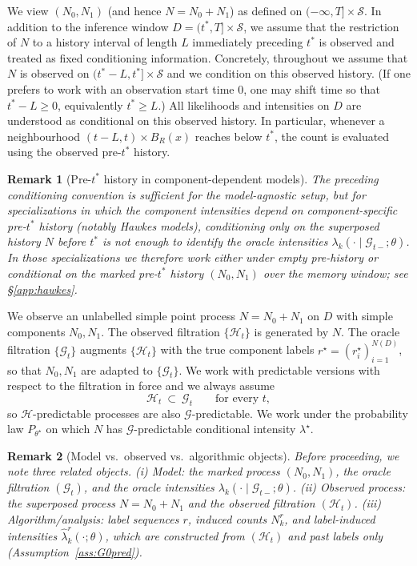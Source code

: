 \documentclass{statsoc}
\newtheorem{remark}[remark]{Remark}
\newcommand{\1}{\mathbbm{1}}
\begin{document}
We view $(N_0,N_1)$ (and hence $N=N_0+N_1$) as defined on $(-\infty,T]\times\mathcal S$.
In addition to the inference window $D=(t^\ast,T]\times\mathcal S$, we assume that the restriction of $N$ to a history interval of length $L$ immediately preceding $t^\ast$ is observed and treated as fixed conditioning information. Concretely, throughout we assume that $N$ is observed on $(t^\ast-L,t^\ast]\times\mathcal S$ and we condition on this observed history. (If one prefers to work with an observation start time $0$, one may shift time so that $t^\ast-L\ge 0$, equivalently $t^\ast\ge L$.) All likelihoods and intensities on $D$ are understood as conditional on this observed history. In particular, whenever a neighbourhood $(t-L,t)\times B_R(x)$ reaches below $t^\ast$, the count is evaluated using the observed pre-$t^\ast$ history.

\begin{remark}[Pre-\(t^\ast\) history in component-dependent models]\label{rem:prehistory-marked}
The preceding conditioning convention is sufficient for the model-agnostic setup, but for specializations in which the component intensities depend on component-specific pre-\(t^\ast\) history (notably Hawkes models), conditioning only on the superposed history \(N\) before \(t^\ast\) is not enough to identify the oracle intensities \(\lambda_k(\cdot\mid\mathcal G_{t-};\theta)\). In those specializations we therefore work either under empty pre-history or conditional on the marked pre-\(t^\ast\) history \((N_0,N_1)\) over the memory window; see \S\ref{app:hawkes}.
\end{remark}



We observe an unlabelled simple point process $N=N_0+N_1$ on $D$ with simple components $N_0,N_1$. The observed filtration $\{\mathcal H_t\}$ is generated by $N$. The oracle filtration $\{\mathcal G_t\}$ augments $\{\mathcal H_t\}$ with the true component labels $r^\star=(r^\star_i)_{i=1}^{N(D)}$, so that $N_0,N_1$ are adapted to $\{\mathcal G_t\}$. We work with predictable versions with respect to the filtration in force and we always assume
\[
\mathcal H_t\ \subset\ \mathcal G_t\qquad\text{for every }t,
\]
so $\mathcal H$-predictable processes are also $\mathcal G$-predictable. We work under the probability law $P_{\theta^\star}$ on which $N$ has $\mathcal G$-predictable conditional intensity $\lambda^\star$.

\begin{remark}[Model vs.\ observed vs.\ algorithmic objects]\label{rem:objects}
Before proceeding, we note three related objects. (i) Model: the marked process $(N_0,N_1)$, the oracle filtration $(\mathcal G_t)$, and the oracle intensities
$\lambda_k(\cdot\mid \mathcal G_{t-};\theta)$. (ii) Observed process: the superposed process $N=N_0+N_1$ and the observed filtration $(\mathcal H_t)$. (iii) Algorithm/analysis: label sequences $r$, induced counts $N_k^r$, and label-induced intensities
$\widehat\lambda_k^r(\cdot;\theta)$, which are constructed from $(\mathcal H_t)$ and past labels only
(Assumption~\ref{ass:G0pred}).
\end{remark}
\end{document}
